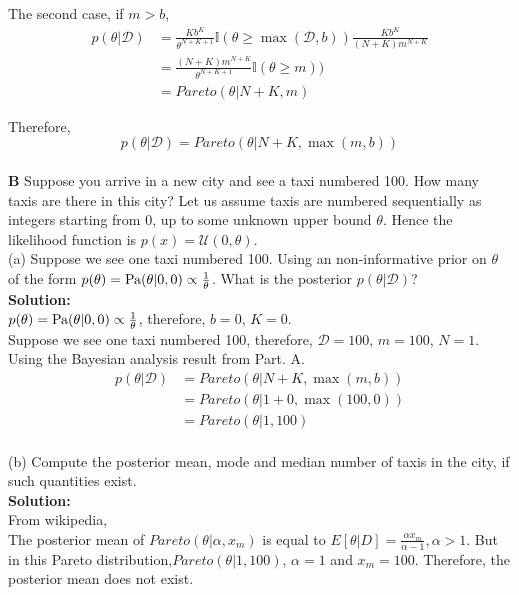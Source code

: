 \documentclass{article}
\begin{document}
The second case, if $m > b$,
\begin{equation}
\begin{aligned}
 p(\theta | \mathcal{D}) & = \frac{Kb^{K}}{\theta^{N+K+1}} \mathbb{I}(\theta \geq \max(\mathcal{D},b))  \frac{Kb^{K}}{(N+K)m^{N+K}} \\
 & = \frac{(N+K)m^{N+K}}{\theta^{N+K+1}} \mathbb{I}(\theta \geq m)) \\
 & = Pareto(\theta|N+K,m)
\end{aligned}
\end{equation}

Therefore, 
\begin{equation}
  p(\theta | \mathcal{D}) = Pareto(\theta|N+K,\max(m,b))  
\end{equation}
\\
\textbf{B} Suppose you arrive in a new city and see a taxi numbered 100. How many taxis are there in this city? Let us assume taxis are numbered sequentially as integers starting from 0, up to some unknown upper bound $\theta$. Hence the likelihood function is $p(x) = \mathcal{U}(0,\theta)$.
\\
(a) Suppose we see one taxi numbered 100. Using an non-informative prior on $\theta$ of the form $p(\theta) = \rm Pa(\theta|0,0) \propto \frac{1}{\theta}$. What is the posterior $p(\theta | \mathcal{D})$?
\\
\textbf{Solution:}\\
$p(\theta) = \rm Pa(\theta|0,0) \propto \frac{1}{\theta}$, therefore, $b=0$, $K=0$. \\
Suppose we see one taxi numbered 100, therefore, $\mathcal{D}={100}$, $m=100$, $N=1$.
Using the Bayesian analysis result from Part. A.
\begin{equation}
\begin{aligned}
  p(\theta | \mathcal{D}) & = Pareto(\theta|N+K,\max{(m,b)})  \\
  & =  Pareto(\theta|1+0,\max(100,0)) \\
  & =  Pareto(\theta|1,100)
\end{aligned}
\end{equation}
\\
(b) Compute the posterior mean, mode and median number of taxis in the city, if such quantities exist. \\
\textbf{Solution:}\\
From wikipedia, \\
The posterior mean of  $Pareto(\theta|\alpha,x_{m})$ is equal to $E[\theta|D] = \frac{\alpha x_{m}}{\alpha -1}, \alpha>1$. But in this Pareto distribution,$Pareto(\theta|1,100)$, $\alpha=1$ and $x_{m}=100$. Therefore, the posterior mean does not exist. \\
\end{document}
